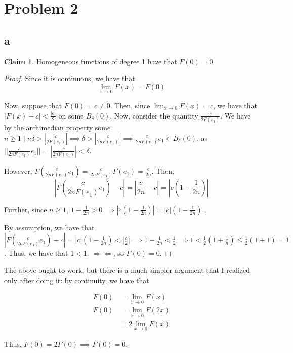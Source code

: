 \documentclass[12pt,letterpaper]{article}
\theoremstyle{definition}
\newtheorem*{claim}{Claim}
\newcommand{\contra}{\Rightarrow\!\Leftarrow}
\begin{document}
\section*{Problem 2}

\subsection*{a}

\begin{claim}
  Homogeneous functions of degree 1 have that $F(0) = 0$.
\end{claim}

\begin{proof}
  Since it is continuous, we have that
  \[
    \lim_{x\rightarrow 0}F(x) = F(0)
  \]

  Now, suppose that $F(0) = c \neq 0$. Then, since $\lim_{x\rightarrow 0}F(x) =
  c$, we have that $|F(x) - c| < \frac{|c|}{2}$ on some $B_{\delta}(0)$. Now,
  consider the quantity $\frac{c}{2F(e_1)}$. We have by the archimedian property
  some $n \geq 1 \mid n\delta > |\frac{c}{2F(e_1)}| \implies \delta >
  |\frac{c}{2nF(e_1)}| \implies \frac{c}{2nF(e_1)}e_1 \in B_\delta(0)$, as
  $||\frac{c}{2nF(e_1)}e_1|| = |\frac{c}{2nF(e_1)}| < \delta$.

  However, $F(\frac{c}{2nF(e_1)}e_1) = \frac{c}{2nF(e_1)}F(e_1) = \frac{c}{2n}$.
  Then,
  \[
    |F(\frac{c}{2nF(e_1)}e_1) - c| = |\frac{c}{2n} - c| = |c(1 - \frac{1}{2n})|
  \]

  Further, since $n \geq 1$, $1 - \frac{1}{2n} > 0 \implies |c(1 -
  \frac{1}{2n})| = |c|(1 - \frac{1}{2n})$.

  By assumption, we have that $|F(\frac{c}{2nF(e_1)}e_1) - c| = |c|(1 -
  \frac{1}{2n}) < |\frac{c}{2}| \implies 1 - \frac{1}{2n} < \frac{1}{2} \implies
  1 < \frac{1}{2}(1 + \frac{1}{n}) \leq \frac{1}{2}(1 + 1) = 1$. Thus, we have
  that $1 < 1$. $\contra$, so $F(0) = 0$.
\end{proof}

The above ought to work, but there is a much simpler argument that I realized
only after doing it: by continuity, we
have that

\begin{align*}
  F(0) &= \lim_{x \rightarrow 0}F(x) \\
  F(0) &= \lim_{x \rightarrow 0}F(2x) \\
       &= 2\lim_{x \rightarrow 0}F(x)
\end{align*}

Thus, $F(0) = 2F(0) \implies F(0) = 0$.
\end{document}
